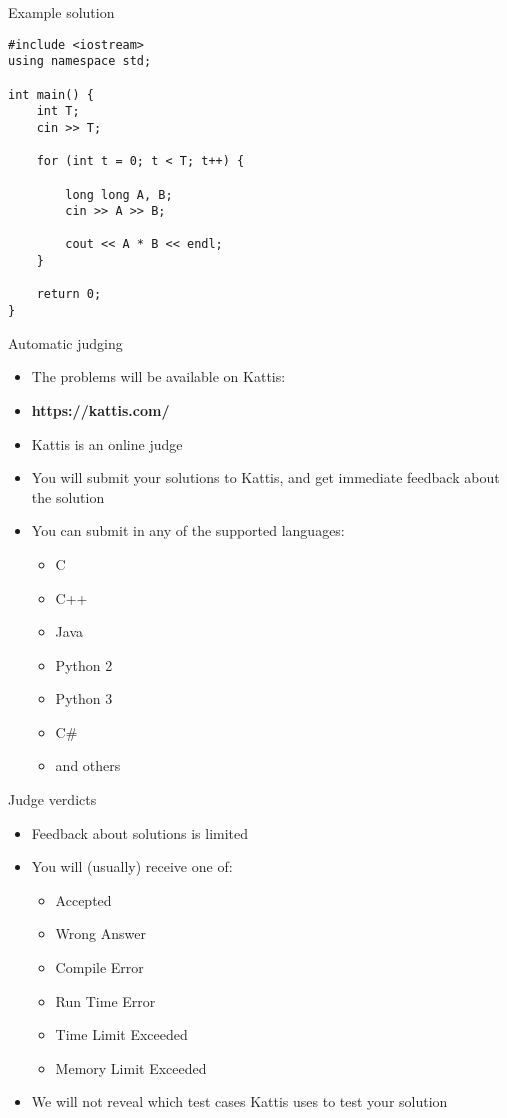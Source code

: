 \documentclass[10pt]{beamer}
\newcommand{\bi}{\begin{itemize}}
\newcommand{\ei}{\end{itemize}}
\begin{document}
\begin{frame}[fragile]{Example solution}
    \begin{verbatim}
#include <iostream>
using namespace std;

int main() {
    int T;
    cin >> T;

    for (int t = 0; t < T; t++) {

        long long A, B;
        cin >> A >> B;

        cout << A * B << endl;
    }

    return 0;
}
\end{verbatim}

    \bi
    \ei
\end{frame}


\begin{frame}{Automatic judging}
    \bi
        \item The problems will be available on Kattis:
        \item \textbf{https://kattis.com/}
        \vspace{20pt}
        \item Kattis is an online judge
        \item You will submit your solutions to Kattis, and get immediate feedback about the solution
        \item You can submit in any of the supported languages:
            \bi
                \item C
                \item C++
                \item Java
                \item Python 2
                \item Python 3
                \item C\#{}
                \item and others
            \ei
    \ei
\end{frame}

\begin{frame}{Judge verdicts}
    \bi
        \item Feedback about solutions is limited
        \item You will (usually) receive one of:
            \bi
                \item Accepted
                \item Wrong Answer
                \item Compile Error
                \item Run Time Error
                \item Time Limit Exceeded
                \item Memory Limit Exceeded
            \ei

        \item We will not reveal which test cases Kattis uses to test your solution
    \ei
\end{frame}
\end{document}
